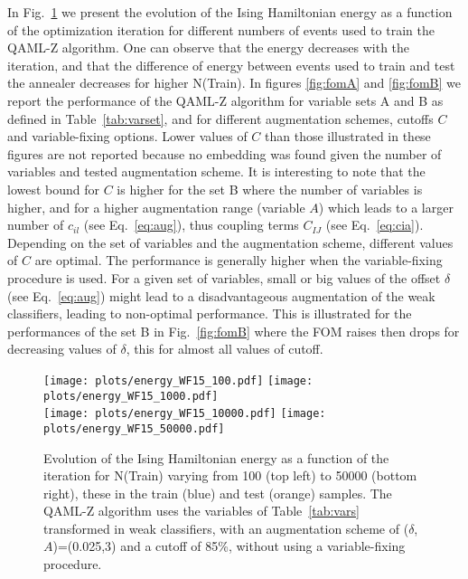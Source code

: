 \documentclass{article}
\begin{document}
In Fig.~\ref{fig:enwf15} we present the evolution of the Ising 
Hamiltonian energy as a function of the optimization iteration for 
different numbers of events used to train the QAML-Z algorithm. One can observe that 
the energy decreases with the iteration, and that the difference of energy 
between events used to train and test the annealer decreases for higher 
N(Train). In figures \ref{fig:fomA} and \ref{fig:fomB} we report the 
performance of the QAML-Z algorithm for variable sets A and B as defined in 
Table~\ref{tab:varset}, and for different augmentation schemes, cutoffs 
$C$ and variable-fixing options. Lower values of $C$ than those 
illustrated in these figures are not reported because no embedding was 
found given the number of variables and tested augmentation scheme. It is 
interesting to note that the lowest bound for $C$ is higher for the set B 
where the number of variables is higher, and for a higher augmentation 
range (variable $A$) which leads to a larger number of $c_{il}$ (see 
Eq.~\ref{eq:aug}), thus coupling terms $C_{IJ}$ (see Eq.~\ref{eq:cia}). 
Depending on the set of variables and the augmentation scheme, different 
values of $C$ are optimal. The performance is generally higher when the 
variable-fixing procedure is used. For a given set of variables, small or 
big values of the offset $\delta$ (see Eq.~\ref{eq:aug}) might lead to a 
disadvantageous augmentation of the weak classifiers, leading to 
non-optimal performance. This is illustrated for the performances of the 
set B in Fig.~\ref{fig:fomB} where the FOM raises then drops for 
decreasing values of $\delta$, this for almost all values of cutoff.

\begin{figure}[!htbp]
\begin{center}
\texttt{[image: plots/energy\_WF15\_100.pdf]}
\texttt{[image: plots/energy\_WF15\_1000.pdf]} \\
\texttt{[image: plots/energy\_WF15\_10000.pdf]}
\texttt{[image: plots/energy\_WF15\_50000.pdf]}
\end{center}
\caption{Evolution of the Ising Hamiltonian energy as a function of the
  iteration for N(Train) varying from 100 (top left) to 50000 (bottom right),
  these in the train (blue) and test (orange) samples.
  The QAML-Z algorithm uses the variables of Table~\ref{tab:vars} transformed in weak
  classifiers, with an augmentation scheme of ($\delta$,$A$)=(0.025,3) and
  a cutoff of 85\%, without using a variable-fixing procedure.}
\label{fig:enwf15}
\end{figure}
\end{document}
